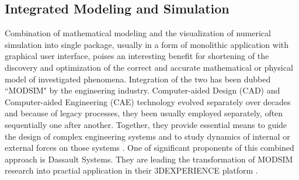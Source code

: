 %
%
%
%


\subsection{Integrated Modeling and Simulation}\label{sec:integratedmodsim}
Combination of mathematical modeling and the visualization of numerical simulation into single package, usually in a form of monolithic application with graphical user interface, poises an interesting benefit for shortening of the discovery and optimization of the correct and accurate mathematical or physical model of investigated phenomena. Integration of the two has been dubbed ``MODSIM" by the engineering industry. Computer-aided Design (CAD) and Computer-aided Engineering (CAE) technology evolved separately over decades and because of legacy processes, they been usually employed separately, often sequentially one after another. Together, they provide essential means to guide the design of complex engineering systems and to study dynamics of internal or external forces on those systems \citep{mahmoodIntegratedModelingSimulation2019}. One of significant proponents of this combined approach is Dassault Systems. They are leading the transformation of MODSIM research into practial application in their 3DEXPERIENCE platform \citep{systemsExperienceYourDesign2019}. 


